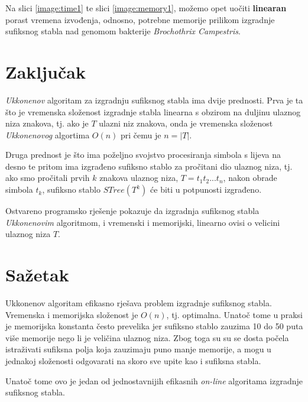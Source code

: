 \documentclass[times, utf8, seminar, numeric]{fer}
\begin{document}
Na slici \ref{image:time1} te slici \ref{image:memory1}, možemo opet uočiti \textbf{linearan} porast vremena izvođenja, odnosno, potrebne memorije prilikom izgradnje sufiksnog stabla nad genomom bakterije \textit{Brochothrix Campestris}.



\chapter{Zaključak}
	\textit{Ukkonenov} algoritam za izgradnju sufiksnog stabla ima dvije prednosti. Prva je ta što je vremenska složenost izgradnje stabla linearna s obzirom na duljinu ulaznog niza znakova, tj. ako je $T$ ulazni niz znakova, onda je vremenska složenost \textit{Ukkonenovog} algortima $O(n)$ pri čemu je $n = |T|$.
	
	Druga prednost je što ima poželjno svojstvo procesiranja simbola s lijeva na desno te pritom ima izgrađeno sufiksno stablo za pročitani dio ulaznog niza, tj. ako smo pročitali prvih $k$ znakova ulaznog niza, $T = t_1 t_2 ... t_n$, nakon obrade simbola $t_k$, sufiksno stablo $STree(T^k)$ će biti u potpunosti izgrađeno.

 	Ostvareno programsko rješenje pokazuje da izgradnja sufiksnog stabla \textit{Ukkonenovim} algoritmom, i vremenski i memorijski, linearno ovisi o velicini ulaznog niza $T$.




\chapter{Sažetak}
Ukkonenov algoritam efikasno rješava problem izgradnje sufiksnog stabla. Vremenska i memorijska složenost je $O(n)$, tj. optimalna. Unatoč tome u praksi je memorijska konstanta često prevelika jer sufiksno stablo zauzima 10 do 50 puta više memorije nego li je veličina ulaznog niza. Zbog toga su su se dosta počela istraživati sufiksna polja koja zauzimaju puno manje memorije, a mogu u jednakoj složenosti odgovarati na skoro sve upite kao i sufiksna stabla.

Unatoč tome ovo je jedan od jednostavnijih efikasnih \textit{on-line} algoritama izgradnje sufiksnog stabla.
\end{document}
